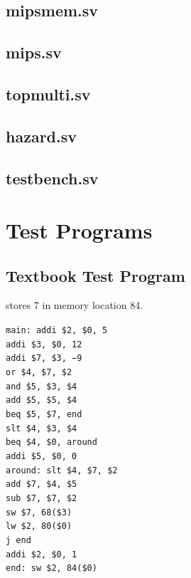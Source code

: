 \documentclass[titlepage,12pt,oneside,a4paper]{article}
\newcommand{\code}[1]{{\texttt{#1}}}
\begin{document}
\begin{multicols}{2}
\subsection{mipsmem.sv}


\subsection{mips.sv}


\subsection{topmulti.sv}


\subsection{hazard.sv}


\subsection{testbench.sv}
\label{appendix:src:mipsparts}


\section{Test Programs}
\label{appendix:tests}

\subsection{Textbook Test Program}
stores 7 in memory location 84.

\code{main: addi \$2, \$0, 5\\
	addi \$3, \$0, 12\\
	addi \$7, \$3, −9\\
	or \$4, \$7, \$2 \\
	and \$5, \$3, \$4\\
	add \$5, \$5, \$4\\
	beq \$5, \$7, end\\
	slt \$4, \$3, \$4\\
	beq \$4, \$0, around\\
	addi \$5, \$0, 0\\
	around: slt \$4, \$7, \$2\\
	add \$7, \$4, \$5\\
	sub \$7, \$7, \$2\\
	sw \$7, 68(\$3)\\
	lw \$2, 80(\$0)\\
	j end\\
	addi \$2, \$0, 1\\
	end: sw \$2, 84(\$0)}\\


\end{multicols}
\end{document}
